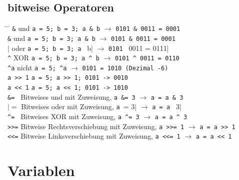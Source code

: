 \documentclass[twoside,a4paper,12pt]{article}
\begin{document}
\subsection{bitweise Operatoren}
\begin{tabbing}
 \hspace{2mm} \= \hspace{30mm} \= \kill
 \> \verb|&| \> und \verb|a = 5; b = 3; a & b| $\rightarrow$ \verb|0101 & 0011 = 0001| \\ 
 \> \verb|&| \> und \verb|a = 5; b = 3; a & b| $\rightarrow$ \verb|0101 & 0011 = 0001| \\ 
 \> \verb||| \> oder \verb|a = 5; b = 3; a | b| $\rightarrow$ \verb|0101 | 0011 = 0111| \\ 
 \> \verb|^| \> XOR \verb|a = 5; b = 3; a ^ b| $\rightarrow$ \verb|0101 ^ 0011 = 0110| \\ 
 \> \verb|^a| \> nicht \verb|a = 5; ^a| $\rightarrow$ \verb|0101 = 1010 (Dezimal -6)| \\
 \> \verb|a >> 1| \> \verb|a = 5; a >> 1; 0101 -> 0010| \\
 \> \verb|a << 1| \> \verb|a = 5; a << 1; 0101 -> 1010| \\
 \> \verb|&= | \> Bitweises und mit Zuweisung, \verb|a &= 3| $\rightarrow$ \verb|a = a & 3| \\ 
 \> $|= $ \> Bitweises oder mit Zuweisung, \verb|a |= 3| $\rightarrow$ \verb|a = a | 3| \\ 
 \> \verb|^= | \> Bitweises XOR mit Zuweisung, \verb|a ^= 3| $\rightarrow$ \verb|a = a ^ 3| \\ 
 \> \verb|>>=| \> Bitweise Rechtsverschiebung mit Zuweisung, \verb|a >>= 1| $\rightarrow$ \verb|a = a >> 1| \\ 
 \> \verb|<<=| \> Bitweise Linksverschiebung mit Zuweisung, \verb|a <<= 1| $\rightarrow$ \verb|a = a << 1| \\
\end{tabbing}

\section{Variablen}
\end{document}
